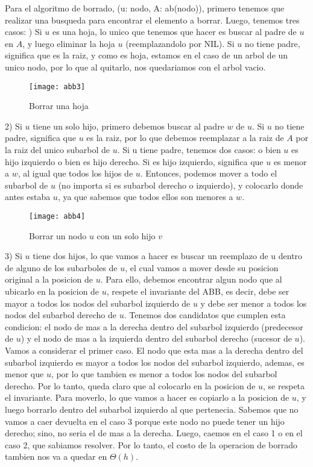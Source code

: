 \documentclass[10pt,a4paper]{article}
\begin{document}
Para el algoritmo de borrado, (u: nodo, A: ab(nodo)), primero tenemos que realizar una busqueda para encontrar el elemento a borrar. Luego, tenemos tres casos:
\newline
{}) Si $u$ es una hoja, lo unico que tenemos que hacer es buscar al padre de $u$ en $A$, y luego eliminar la hoja $u$ (reemplazandolo por NIL). Si $u$ no tiene padre, significa que es la raiz, y como es hoja, estamos en el caso de un arbol de un unico nodo, por lo que al quitarlo, nos quedariamos con el arbol vacio.

\begin{figure}[h]
	\centering
	\texttt{[image: abb3]}
	\caption{Borrar una hoja}
	\label{drivers1}
\end{figure}

2) Si $u$ tiene un solo hijo, primero debemos buscar al padre $w$ de $u$. Si $u$ no tiene padre, significa que $u$ es la raiz, por lo que debemos reemplazar a la raiz de $A$ por la raiz del unico subarbol de $u$. Si u tiene padre, tenemos dos casos: o bien $u$ es hijo izquierdo o bien es hijo derecho. Si es hijo izquierdo, significa que $u$ es menor a $w$, al igual que todos los hijos de $u$. Entonces, podemos mover a todo el subarbol de $u$ (no importa si es subarbol derecho o izquierdo), y colocarlo donde antes estaba $u$, ya que sabemos que todos ellos son menores a $w$.

\begin{figure}[h]
	\centering
	\texttt{[image: abb4]}
	\caption{Borrar un nodo $u$ con un solo hijo $v$}
	\label{drivers1}
\end{figure}

3) Si $u$ tiene dos hijos, lo que vamos a hacer es buscar un reemplazo de u dentro de alguno de los subarboles de $u$, el cual vamos a mover desde su posicion original a la posicion de $u$. Para ello, debemos encontrar algun nodo que al ubicarlo en la posicion de $u$, respete el invariante del ABB, es decir, debe ser mayor a todos los nodos del subarbol izquierdo de $u$ y debe ser menor a todos los nodos del subarbol derecho de $u$. Tenemos dos candidatos que cumplen esta condicion: el nodo de mas a la derecha dentro del subarbol izquierdo (predecesor de $u$) y el nodo de mas a la izquierda dentro del subarbol derecho (sucesor de $u$). Vamos a considerar el primer caso. El nodo que esta mas a la derecha dentro del subarbol izquierdo es mayor a todos los nodos del subarbol izquierdo, ademas, es menor que $u$, por lo que tambien es menor a todos los nodos del subarbol derecho. Por lo tanto, queda claro que al colocarlo en la posicion de $u$, se respeta el invariante. Para moverlo, lo que vamos a hacer es copiarlo a la posicion de $u$, y luego borrarlo dentro del subarbol izquierdo al que pertenecia. Sabemos que no vamos a caer devuelta en el caso
3 porque este nodo no puede tener un hijo derecho; sino, no seria el de mas a la derecha. Luego, caemos en el caso 1 o en el caso 2, que sabiamos resolver. Por lo tanto, el costo de la operacion de borrado tambien nos va a quedar en $\Theta(h)$.
\end{document}
